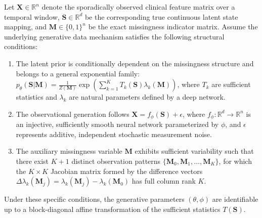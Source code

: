 \begin{theorem}
Let $\mathbf{X} \in \mathbb{R}^n$ denote the sporadically observed clinical feature matrix over a temporal window, $\mathbf{S} \in \mathbb{R}^d$ be the corresponding true continuous latent state mapping, and $\mathbf{M} \in \{0, 1\}^n$ be the exact missingness indicator matrix. Assume the underlying generative data mechanism satisfies the following structural conditions:
\begin{enumerate}
    \item The latent prior is conditionally dependent on the missingness structure and belongs to a general exponential family: $p_{\theta}(\mathbf{S} | \mathbf{M}) = \frac{1}{Z(\mathbf{M})} \exp\left( \sum_{k=1}^K T_{k}(\mathbf{S}) \lambda_{k}(\mathbf{M}) \right)$, where $T_k$ are sufficient statistics and $\lambda_k$ are natural parameters defined by a deep network.
    \item The observational generation follows $\mathbf{X} = f_{\phi}(\mathbf{S}) + \epsilon$, where $f_{\phi}: \mathbb{R}^d \rightarrow \mathbb{R}^n$ is an injective, sufficiently smooth neural network parameterized by $\phi$, and $\epsilon$ represents additive, independent stochastic measurement noise.
    \item The auxiliary missingness variable $\mathbf{M}$ exhibits sufficient variability such that there exist $K+1$ distinct observation patterns $\{\mathbf{M}_0, \mathbf{M}_1, \dots, \mathbf{M}_K\}$, for which the $K \times K$ Jacobian matrix formed by the difference vectors $\Delta\lambda_k(\mathbf{M}_j) = \lambda_k(\mathbf{M}_j) - \lambda_k(\mathbf{M}_0)$ has full column rank $K$.
\end{enumerate}
Under these specific conditions, the generative parameters $(\theta, \phi)$ are identifiable up to a block-diagonal affine transformation of the sufficient statistics $T(\mathbf{S})$.
\end{theorem}

